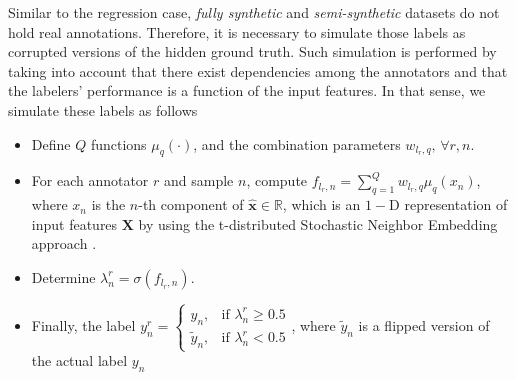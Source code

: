 \documentclass[journal]{IEEEtran}
\providecommand{\ve}[1]{{\bm{#1}}}%
\providecommand{\mat}[1]{{\bm{#1}}} %
\newcommand{\Real}{\mathbb{R}}
\providecommand{\ve}[1]{{\mathbf{#1}}}
\providecommand{\mat}[1]{{\mathbf{#1}}}
\begin{document}
Similar to the regression case, \textit{fully synthetic} and \textit{semi-synthetic} datasets do not hold real annotations. Therefore, it is necessary to simulate those labels as corrupted versions of the hidden ground truth. Such simulation is performed by taking into account that there exist dependencies among the annotators and that the labelers' performance is a function of the input features. In that sense, we simulate these labels as follows
\begin{itemize}
    \item Define $Q$ functions $\mu_q(\cdot)$, and the combination parameters $w_{l_r,q},\,\forall r, n$.
    \item For each annotator $r$ and sample $n$, compute $f_{l_r,n} = \sum_{q=1}^{Q}w_{l_r,q}\mu_q(x_n)$, where $x_n$ is the $n$-th component of $\hat{\ve{x}}\in \Real$, which is an $1-$D representation of input features $\mat{X}$ by using the t-distributed Stochastic Neighbor Embedding approach \cite{maaten2008visualizing}.
    \item Determine $\lambda_{n}^r = \sigma(f_{l_r,n})$. 
    \item Finally, the label $y_n^r = \begin{cases}y_n, &\mbox{if }\lambda_{n}^r \ge 0.5\\ \tilde{y}_n, & \mbox{if }\lambda_{n}^r <0.5 \end{cases}$, where $\tilde{y}_n$ is a flipped version of the actual label $y_n$
\end{itemize}
\end{document}
